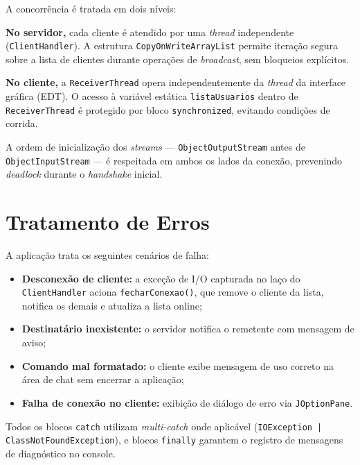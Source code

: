 \documentclass[10pt,twocolumn,a4paper]{article}
\begin{document}
A concorrência é tratada em dois níveis:

\textbf{No servidor,} cada cliente é atendido por uma \textit{thread}
independente (\texttt{ClientHandler}). A estrutura
\texttt{CopyOnWriteArrayList} permite iteração segura sobre a lista de clientes
durante operações de \textit{broadcast}, sem bloqueios explícitos.

\textbf{No cliente,} a \texttt{ReceiverThread} opera independentemente da
\textit{thread} da interface gráfica (EDT). O acesso à variável estática
\texttt{listaUsuarios} dentro de \texttt{ReceiverThread} é protegido por bloco
\texttt{synchronized}, evitando condições de corrida.

A ordem de inicialização dos \textit{streams} — \texttt{ObjectOutputStream}
antes de \texttt{ObjectInputStream} — é respeitada em ambos os lados da
conexão, prevenindo \textit{deadlock} durante o \textit{handshake} inicial.


\section{Tratamento de Erros}

A aplicação trata os seguintes cenários de falha:

\begin{itemize}
    \item \textbf{Desconexão de cliente:} a exceção de I/O capturada no laço do
          \texttt{ClientHandler} aciona \texttt{fecharConexao()}, que remove o
          cliente da lista, notifica os demais e atualiza a lista online;
    \item \textbf{Destinatário inexistente:} o servidor notifica o remetente
          com mensagem de aviso;
    \item \textbf{Comando mal formatado:} o cliente exibe mensagem de uso
          correto na área de chat sem encerrar a aplicação;
    \item \textbf{Falha de conexão no cliente:} exibição de diálogo de erro
          via \texttt{JOptionPane}.
\end{itemize}

Todos os blocos \texttt{catch} utilizam \textit{multi-catch} onde aplicável
(\texttt{IOException | ClassNotFoundException}), e blocos \texttt{finally}
garantem o registro de mensagens de diagnóstico no console.

\end{document}
